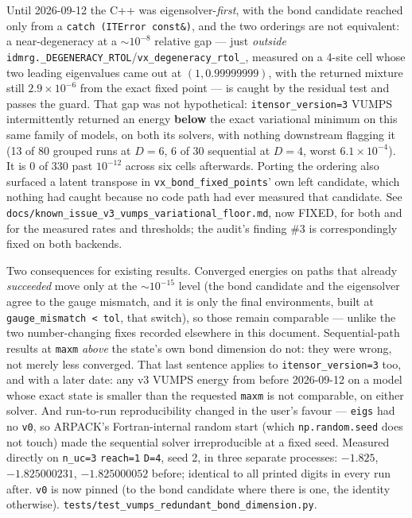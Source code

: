 \documentclass[11pt]{article}
\begin{document}
Until 2026-09-12 the C++ was eigensolver-\emph{first}, with the bond
candidate reached only from a \texttt{catch (ITError const\&)}, and the
two orderings are not equivalent: a
near-degeneracy at a $\sim10^{-8}$ relative gap --- just \emph{outside}
\texttt{idmrg.\_DEGENERACY\_RTOL}/\texttt{vx\_degeneracy\_rtol\_},
measured on a 4-site cell whose two leading eigenvalues came out at
$(1, 0.99999999)$, with the returned mixture still $2.9\times10^{-6}$
from the exact fixed point --- is caught by the residual test and passes
the guard. That gap was not hypothetical:
\texttt{itensor\_version=3} VUMPS intermittently returned an energy
\textbf{below} the exact variational minimum on this same family of
models, on both its solvers, with nothing downstream flagging it (13 of
80 grouped runs at $D=6$, 6 of 30 sequential at $D=4$, worst
$6.1\times10^{-4}$). It is 0 of 330 past $10^{-12}$ across six cells
afterwards. Porting the ordering also surfaced a latent transpose in
\texttt{vx\_bond\_fixed\_points}' own left candidate, which nothing had
caught because no code path had ever measured that candidate. See
\texttt{docs/known\_issue\_v3\_vumps\_variational\_floor.md}, now FIXED,
for both and for the measured rates and thresholds; the audit's finding
\#3 is correspondingly fixed on both backends.

Two consequences for existing results. Converged energies on paths that
already \emph{succeeded} move only at the $\sim10^{-15}$ level (the bond
candidate and the eigensolver agree to the gauge mismatch, and it is only
the final environments, built at \texttt{gauge\_mismatch < tol}, that
switch), so those remain comparable --- unlike the two number-changing
fixes recorded elsewhere in this document. Sequential-path results at
\texttt{maxm} \emph{above} the state's own bond dimension do not: they
were wrong, not merely less converged. That last sentence applies to
\texttt{itensor\_version=3} too, and with a later date: any v3 VUMPS
energy from before 2026-09-12 on a model whose exact state is smaller
than the requested \texttt{maxm} is not comparable, on either solver. And run-to-run reproducibility
changed in the user's favour --- \texttt{eigs} had no \texttt{v0}, so
ARPACK's Fortran-internal random start (which \texttt{np.random.seed}
does not touch) made the sequential solver irreproducible at a fixed
seed. Measured directly on \texttt{n\_uc=3} \texttt{reach=1}
\texttt{D=4}, seed 2, in three separate processes: $-1.825$,
$-1.825000231$, $-1.825000052$ before; identical to all printed digits in
every run after. \texttt{v0} is now pinned (to the bond candidate where
there is one, the identity otherwise).
\texttt{tests/test\_vumps\_redundant\_bond\_dimension.py}.
\end{document}
